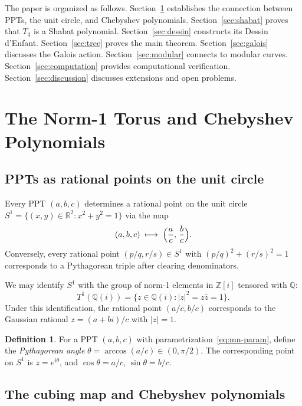 \documentclass[12pt]{amsart}
\theoremstyle{definition}
\newtheorem{definition}[theorem]{Definition}
\theoremstyle{remark}
\newcommand{\ZZ}{\mathbb{Z}}
\newcommand{\QQ}{\mathbb{Q}}
\newcommand{\RR}{\mathbb{R}}
\begin{document}
The paper is organized as follows.  Section~\ref{sec:torus} establishes
the connection between PPTs, the unit circle, and Chebyshev polynomials.
Section~\ref{sec:shabat} proves that $T_3$ is a Shabat polynomial.
Section~\ref{sec:dessin} constructs its Dessin d'Enfant.
Section~\ref{sec:tree} proves the main theorem.
Section~\ref{sec:galois} discusses the Galois action.
Section~\ref{sec:modular} connects to modular curves.
Section~\ref{sec:computation} provides computational verification.
Section~\ref{sec:discussion} discusses extensions and open problems.


\section{The Norm-1 Torus and Chebyshev Polynomials}\label{sec:torus}

\subsection{PPTs as rational points on the unit circle}

Every PPT $(a,b,c)$ determines a rational point on the unit circle
$S^1 = \{(x,y)\in\RR^2 : x^2+y^2=1\}$ via the map
\begin{equation}\label{eq:ppt-to-circle}
  (a,b,c) \;\longmapsto\; \Bigl(\frac{a}{c},\, \frac{b}{c}\Bigr).
\end{equation}
Conversely, every rational point $(p/q, r/s)\in S^1$ with
$(p/q)^2 + (r/s)^2 = 1$ corresponds to a Pythagorean triple after
clearing denominators.

We may identify $S^1$ with the group of norm-1 elements in $\ZZ[i]$
tensored with $\QQ$:
\[
  T^1(\QQ(i)) = \{z \in \QQ(i) : |z|^2 = z\bar{z} = 1\}.
\]
Under this identification, the rational point $(a/c, b/c)$ corresponds
to the Gaussian rational $z = (a + bi)/c$ with $|z|=1$.

\begin{definition}\label{def:angle}
For a PPT $(a,b,c)$ with parametrization~\eqref{eq:mn-param}, define
the \emph{Pythagorean angle} $\theta = \arccos(a/c) \in (0,\pi/2)$.
The corresponding point on $S^1$ is $z = e^{i\theta}$, and
$\cos\theta = a/c$, $\sin\theta = b/c$.
\end{definition}

\subsection{The cubing map and Chebyshev polynomials}
\end{document}
